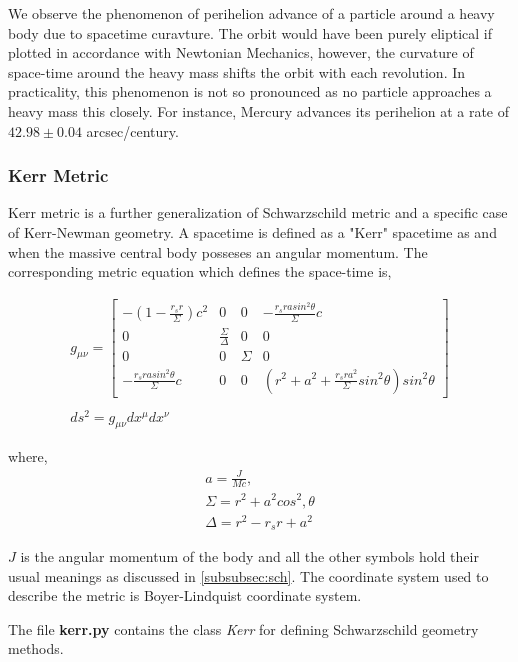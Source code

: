 \documentclass{aastex63}
\begin{document}
We observe the phenomenon of perihelion advance of a particle around a heavy body due to spacetime curavture. The orbit would have been purely eliptical if plotted in accordance with Newtonian Mechanics, however, the curvature of space-time around the heavy mass shifts the orbit with each revolution. In practicality, this phenomenon is not so pronounced as no particle approaches a heavy mass this closely. For instance, Mercury advances its perihelion at a rate of $42.98\pm 0.04$ arcsec/century.

\subsubsection{Kerr Metric}\label{subsubsec:kerr}
Kerr metric is a further generalization of Schwarzschild metric and a specific case of Kerr-Newman geometry. A spacetime is defined as a "Kerr" spacetime as and when the massive central body posseses an angular momentum. The corresponding metric equation which defines the space-time is,

\begin{gather}
g_{\mu \nu} = \begin{bmatrix} - (1 - \frac{r_s r}{\Sigma})c^2 & 0 & 0 & -\frac{r_s r a sin^2 \theta}{\Sigma}c \\ 0 & \frac{\Sigma}{\Delta} & 0 & 0 \\ 0 & 0 & \Sigma & 0 \\ -\frac{r_s r a sin^2 \theta}{\Sigma}c & 0 & 0 &  (r^2 + a^2 + \frac{r_s r a^2}{\Sigma}sin^2 \theta) sin^2 \theta \end{bmatrix} \\ 
\nonumber \\
ds^2 = g_{\mu \nu} dx^\mu dx^\nu
\end{gather}

where,
\begin{gather}
a = \frac{J}{Mc}, \nonumber \\
\Sigma = r^2 + a^2 cos^2, \nonumber \theta \\
\Delta  = r^2 - r_s r + a^2 \nonumber
\end{gather}

$J$ is the angular momentum of the body and all the other symbols hold their usual meanings as discussed in \ref{subsubsec:sch}. The coordinate system used to describe the metric is Boyer-Lindquist coordinate system.

The file \textbf{kerr.py} contains the class \textit{Kerr} for defining Schwarzschild geometry methods.
\end{document}

